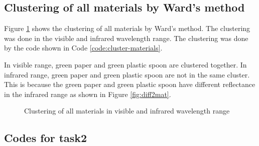 \subsection{Clustering of all materials by Ward's method}
Figure \ref{fig:clustering} shows the clustering of all materials by Ward's method. The clustering was done in the visible and infrared wavelength range. The clustering was done by the code shown in Code \ref{code:cluster-materials}.

In visible range, green paper and green plastic spoon are clustered together. In infrared range, green paper and green plastic spoon are not in the same cluster. This is because the green paper and green plastic spoon have different reflectance in the infrared range as shown in Figure \ref{fig:diff2mat}.

\begin{figure}[H] %
  \centering


  \hspace{0.1cm}

  \caption[]{Clustering of all materials in visible and infrared wavelength range}
  \label{fig:clustering}
\end{figure}

\subsection{Codes for task2}




